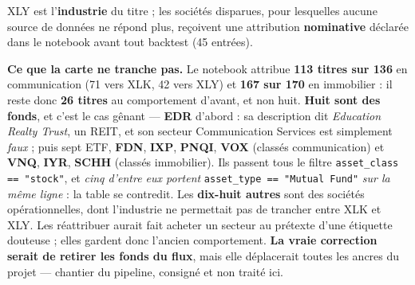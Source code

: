 \documentclass[9pt,a4paper]{extarticle}
\begin{document}
{XLY est l'\textbf{industrie} du titre ; les sociétés disparues, pour lesquelles aucune source de données ne
répond plus, reçoivent une attribution \textbf{nominative} déclarée dans le notebook avant tout backtest
(45 entrées).\par
\vspace{0.4mm}
\textbf{Ce que la carte ne tranche pas.} Le notebook attribue \textbf{113 titres sur 136} en communication
(71 vers XLK, 42 vers XLY) et \textbf{167 sur 170} en immobilier : il reste donc \textbf{26 titres} au
comportement d'avant, et non huit. \textbf{Huit sont des fonds}, et c'est le cas gênant --- \textbf{EDR}
d'abord : sa description dit \og{}\emph{Education Realty Trust}\fg{}, un REIT, et son secteur Communication
Services est simplement \emph{faux} ; puis sept ETF, \textbf{FDN}, \textbf{IXP}, \textbf{PNQI}, \textbf{VOX}
(classés communication) et \textbf{VNQ}, \textbf{IYR}, \textbf{SCHH} (classés immobilier). Ils passent tous
le filtre \texttt{asset\_class == "stock"}, et \emph{cinq d'entre eux portent} \texttt{asset\_type == "Mutual
Fund"} \emph{sur la même ligne} : la table se contredit. Les \textbf{dix-huit autres} sont des sociétés
opérationnelles, dont l'industrie ne permettait pas de trancher entre XLK et XLY.
Les réattribuer aurait fait acheter un secteur au prétexte d'une étiquette douteuse ; elles gardent donc
l'ancien comportement. \textbf{La vraie correction serait de retirer les fonds du flux}, mais elle
déplacerait toutes les ancres du projet --- chantier du pipeline, consigné et non traité ici.\par}
\end{document}
